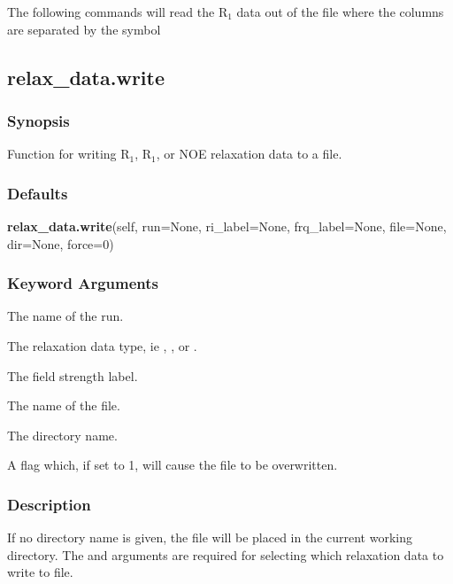 The following commands will read the R$_1$ data out of the file  where the columns are separated by the symbol \quotecmd{\%}





\newpage

\subsection{relax\_data.write}


\subsubsection{Synopsis}

Function for writing R$_1$, R$_1$, or NOE relaxation data to a file.



\subsubsection{Defaults}

\textsf{\textbf{relax\_data.write}(self, run=None, ri\_label=None, frq\_label=None, file=None, dir=None, force=0)}


\subsubsection{Keyword Arguments}

  The name of the run. 

  The relaxation data type, ie , , or . 

  The field strength label. 

  The name of the file. 

  The directory name. 

  A flag which, if set to 1, will cause the file to be overwritten. 




\subsubsection{Description}

If no directory name is given, the file will be placed in the current working directory. The  and  arguments are required for selecting which relaxation data to write to file.




